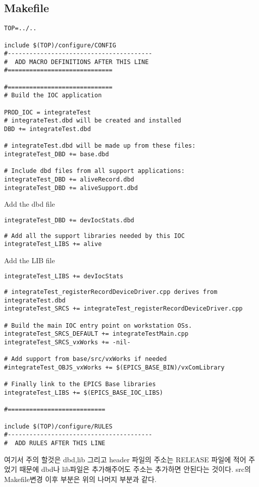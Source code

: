 \documentclass[11pt
  , a4paper
  , article
  , oneside
]{memoir}
\begin{document}
\subsection{Makefile}
\begin{lstlisting}[style=termstyle]
TOP=../..

include $(TOP)/configure/CONFIG
#----------------------------------------
#  ADD MACRO DEFINITIONS AFTER THIS LINE
#=============================

#=============================
# Build the IOC application

PROD_IOC = integrateTest
# integrateTest.dbd will be created and installed
DBD += integrateTest.dbd

# integrateTest.dbd will be made up from these files:
integrateTest_DBD += base.dbd

# Include dbd files from all support applications:
integrateTest_DBD += aliveRecord.dbd
integrateTest_DBD += aliveSupport.dbd
\end{lstlisting}
Add the dbd file
\begin{lstlisting}[style=termstyle]
integrateTest_DBD += devIocStats.dbd
\end{lstlisting}
\begin{lstlisting}[style=termstyle]
# Add all the support libraries needed by this IOC
integrateTest_LIBS += alive
\end{lstlisting}
Add the LIB file
\begin{lstlisting}[style=termstyle]
integrateTest_LIBS += devIocStats
\end{lstlisting}
\begin{lstlisting}[style=termstyle]
# integrateTest_registerRecordDeviceDriver.cpp derives from integrateTest.dbd
integrateTest_SRCS += integrateTest_registerRecordDeviceDriver.cpp

# Build the main IOC entry point on workstation OSs.
integrateTest_SRCS_DEFAULT += integrateTestMain.cpp
integrateTest_SRCS_vxWorks += -nil-

# Add support from base/src/vxWorks if needed
#integrateTest_OBJS_vxWorks += $(EPICS_BASE_BIN)/vxComLibrary

# Finally link to the EPICS Base libraries
integrateTest_LIBS += $(EPICS_BASE_IOC_LIBS)

#===========================

include $(TOP)/configure/RULES
#----------------------------------------
#  ADD RULES AFTER THIS LINE
\end{lstlisting}
여기서 주의 할것은 dbd,lib 그리고 header 파일의 주소는 RELEASE 파일에 적어 주었기 때문에 dbd나 lib파일은 추가해주어도 주소는 추가하면 안된다는 것이다.
src의 Makefile변경 이후 부분은 위의 나머지 부분과 같다.
\end{document}
